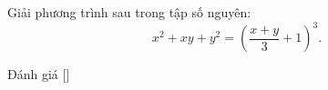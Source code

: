 \ifshowproblem
\begin{problem}\label{problem:USA-2015-JMO-P2}
    Giải phương trình sau trong tập số nguyên:
    \[
        x^2 + xy + y^2 = \left( \frac{x + y}{3} + 1 \right)^3.
    \]
\end{problem}
\fi

\ifshowinfo
Đánh giá [\textbf{}]\footnotemark
{}
\fi
